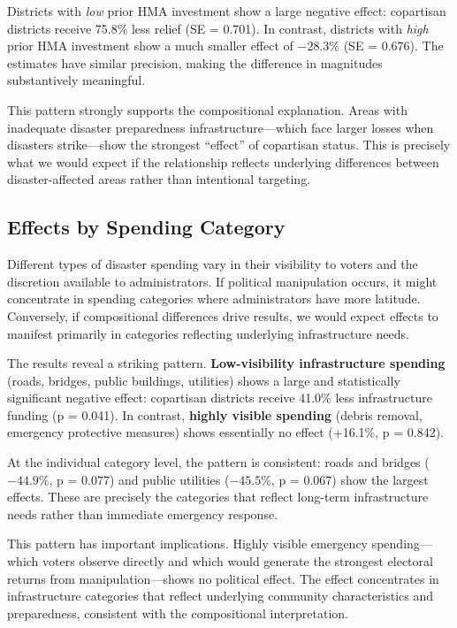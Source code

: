\documentclass[12pt,letterpaper,oneside]{book}
\newcommand{\basepath}{g:/My Drive/Grad School}
\newcommand{\basepath}{basepath}
\begin{document}
Districts with \emph{low} prior HMA investment show a large negative effect: copartisan districts receive 75.8\% less relief (SE = 0.701). In contrast, districts with \emph{high} prior HMA investment show a much smaller effect of $-28.3\%$ (SE = 0.676). The estimates have similar precision, making the difference in magnitudes substantively meaningful.

This pattern strongly supports the compositional explanation. Areas with inadequate disaster preparedness infrastructure---which face larger losses when disasters strike---show the strongest ``effect'' of copartisan status. This is precisely what we would expect if the relationship reflects underlying differences between disaster-affected areas rather than intentional targeting.

\subsection{Effects by Spending Category}

Different types of disaster spending vary in their visibility to voters and the discretion available to administrators. If political manipulation occurs, it might concentrate in spending categories where administrators have more latitude. Conversely, if compositional differences drive results, we would expect effects to manifest primarily in categories reflecting underlying infrastructure needs.



The results reveal a striking pattern. \textbf{Low-visibility infrastructure spending} (roads, bridges, public buildings, utilities) shows a large and statistically significant negative effect: copartisan districts receive 41.0\% less infrastructure funding (p = 0.041). In contrast, \textbf{highly visible spending} (debris removal, emergency protective measures) shows essentially no effect (+16.1\%, p = 0.842).

At the individual category level, the pattern is consistent: roads and bridges ($-44.9\%$, p = 0.077) and public utilities ($-45.5\%$, p = 0.067) show the largest effects. These are precisely the categories that reflect long-term infrastructure needs rather than immediate emergency response.

This pattern has important implications. Highly visible emergency spending---which voters observe directly and which would generate the strongest electoral returns from manipulation---shows no political effect. The effect concentrates in infrastructure categories that reflect underlying community characteristics and preparedness, consistent with the compositional interpretation.
\end{document}
